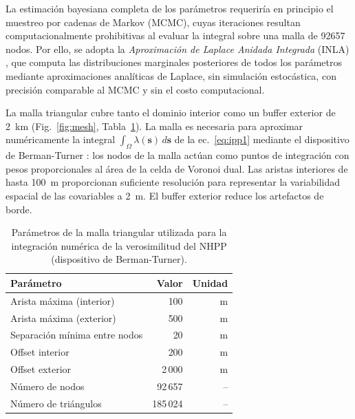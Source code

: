 \documentclass[10pt, twocolumn, letterpaper]{article}
\begin{document}
La estimación bayesiana completa de los parámetros requeriría en principio el
muestreo por cadenas de Markov (MCMC), cuyas iteraciones resultan
computacionalmente prohibitivas al evaluar la integral sobre una malla de
\num{92657} nodos. Por ello, se adopta la \emph{Aproximación de Laplace
Anidada Integrada} (INLA) \cite{rue2009, rue2017}, que computa las
distribuciones marginales posteriores de todos los parámetros mediante
aproximaciones analíticas de Laplace, sin simulación estocástica, con precisión
comparable al MCMC y sin el costo computacional.

La malla triangular cubre tanto el dominio interior como un buffer exterior de
\SI{2}{km} (Fig.~\ref{fig:mesh}, Tabla~\ref{tab:mesh}). La malla es necesaria
para aproximar numéricamente la integral
$\int_\Omega \lambda(\mathbf{s})\,d\mathbf{s}$ de la ec.~\eqref{eq:ipp1}
mediante el dispositivo de Berman-Turner \cite{diggle2013}: los nodos de la
malla actúan como puntos de integración con pesos proporcionales al área de la
celda de Voronoi dual. Las aristas interiores de hasta \SI{100}{m} proporcionan
suficiente resolución para representar la variabilidad espacial de las
covariables a \SI{2}{m}. El buffer exterior reduce los artefactos de borde.

\begin{table}[htbp]
  \centering
  \caption{Parámetros de la malla triangular utilizada para la integración
           numérica de la verosimilitud del NHPP
           (dispositivo de Berman-Turner).}
  \label{tab:mesh}
  \begin{tabular}{lrr}
    \toprule
    Parámetro & Valor & Unidad \\
    \midrule
    Arista máxima (interior)      & 100     & m \\
    Arista máxima (exterior)      & 500     & m \\
    Separación mínima entre nodos & 20      & m \\
    Offset interior               & 200     & m \\
    Offset exterior               & 2\,000  & m \\
    Número de nodos               & 92\,657  & -- \\
    Número de triángulos          & 185\,024 & -- \\
    \bottomrule
  \end{tabular}
\end{table}
\end{document}
